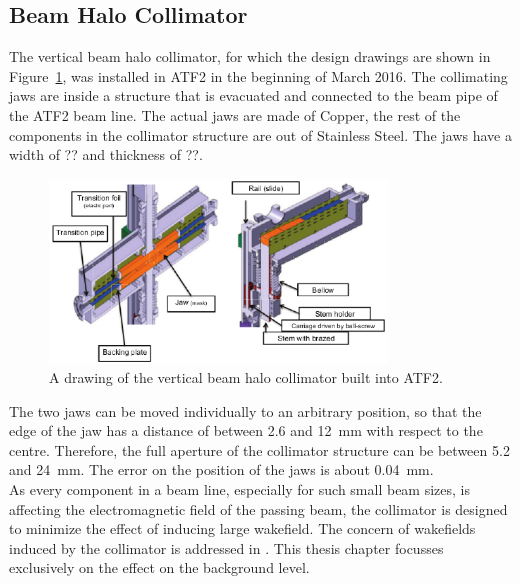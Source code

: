 \subsection{Beam Halo Collimator}
\label{Collimator}

The vertical beam halo collimator, for which the design drawings are shown in Figure~\ref{fig:collimator}, was installed in ATF2 in the beginning of March 2016. The collimating jaws are inside a structure that is evacuated and connected to the beam pipe of the ATF2 beam line. The actual jaws are made of Copper, the rest of the components in the collimator structure are out of Stainless Steel. The jaws have a width of ?? and thickness of ??.

\begin{figure}
\centering
\includegraphics[width=0.8\textwidth]{Figures/ATF2_beamhalo_collimator.pdf}
\caption[Drawing of the beam halo collimator]{A drawing of the vertical beam halo collimator built into ATF2.\cite{NuriaCollimator2015}}
\label{fig:collimator}
\end{figure}

The two jaws can be moved individually to an arbitrary position, so that the edge of the jaw has a distance of between 2.6 and \SI{12}{\milli\metre} with respect to the centre. Therefore, the full aperture of the collimator structure can be between 5.2 and \SI{24}{\milli\metre}. The error on the position of the jaws is about \SI{0.04}{\milli\metre}.\\
As every component in a beam line, especially for such small beam sizes, is affecting the electromagnetic field of the passing beam, the collimator is designed to minimize the effect of inducing large wakefield. The concern of wakefields induced by the collimator is addressed in \cite{NuriaCollimator2015}. This thesis chapter focusses exclusively on the effect on the background level.

